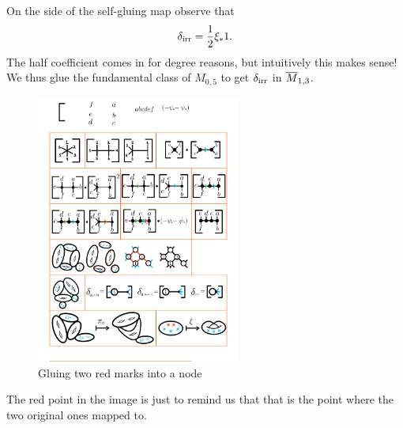 \documentclass[12pt]{memoir}
\begin{document}
\begin{Ex}
    On the side of the self-gluing map observe that 
    $$\dl_{\text{irr}}=\half\xi_\ast 1.$$
    The half coefficient comes in for degree reasons, but intuitively this makes sense! We thus glue the fundamental class of $M_{0,5}$ to get $\delta_{\text{irr}}$ in $\overline M_{1,3}$.
    \begin{figure}[h!]
        \centering
        \includegraphics[width=0.6\textwidth, trim= 12.8cm 2.5cm 1.3cm 23.5cm,clip]{../figs/FigsDNnotability1.pdf}
        \caption{Gluing two red marks into a node}
        \label{fig:glue-fund05-irr13}
    \end{figure}
    The red point in the image is just to remind us that that is the point where the two original ones mapped to.
\end{Ex}
\end{document}
